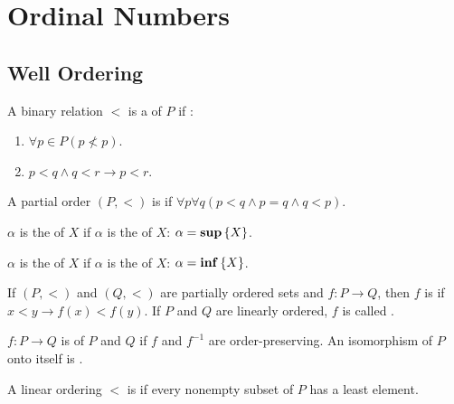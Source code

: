 \section{Ordinal Numbers}

\subsection{Well Ordering}
\begin{definition}
    A binary relation $<$ is a  of $P$ if :
    \begin{enumerate}
        \item $\forall p \in P (p \nless p)$.
        \item $p < q \wedge q < r \rightarrow p < r$.
    \end{enumerate}
\end{definition}

\begin{definition}
    A partial order $(P, <)$ is  if $\forall p \forall q (p < q \wedge p = q \wedge q < p )$.
\end{definition}


\begin{definition}
    $\alpha$ is the  of $X$ if $\alpha$ is the  of $X$: $\alpha = \mathbf{sup} \set{X}$.
\end{definition}

\begin{definition}
    $\alpha$ is the  of $X$ if $\alpha$ is the  of $X$: $\alpha = \mathbf{inf} \set{X}$.
\end{definition}


\begin{definition}
    If $(P, <)$ and $(Q,<)$ are partially ordered sets and $f: P \rightarrow Q$, then $f$ is  if $x < y \rightarrow f(x) < f(y)$. If $P$ and $Q$ are linearly ordered, $f$ is called .
\end{definition}

\begin{definition}
    $f: P \rightarrow Q$  is  of $P$ and $Q$ if $f$ and $f^{-1}$ are order-preserving. An isomorphism of $P$ onto itself is .
\end{definition}


\begin{definition}
    A linear ordering $<$ is  if every nonempty subset of $P$ has a least element.
\end{definition}

